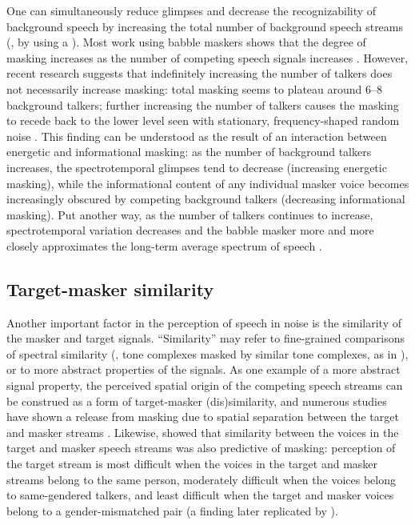 One can simultaneously reduce glimpses and decrease the recognizability of background speech by increasing the total number of background speech streams (\ie, by using a ).  Most work using babble maskers shows that the degree of masking increases as the number of competing speech signals increases \citep[\eg][]{Miller1947, BrungartEtAl2001}.  However, recent research suggests that indefinitely increasing the number of talkers does not necessarily increase masking: total masking seems to plateau around 6–8 background talkers; further increasing the number of talkers causes the masking to recede back to the lower level seen with stationary, frequency-shaped random noise \citep{SimpsonCooke2005}.  This finding can be understood as the result of an interaction between energetic and informational masking: as the number of background talkers increases, the spectrotemporal glimpses tend to decrease (increasing energetic masking), while the informational content of any individual masker voice becomes increasingly obscured by competing background talkers (decreasing informational masking).  Put another way, as the number of talkers continues to increase, spectrotemporal variation decreases and the babble masker more and more closely approximates the long-term average spectrum of speech \citep{SimpsonCooke2005}.

\subsection{Target-masker similarity\label{sec:Similarity}}
Another important factor in the perception of speech in noise is the similarity of the masker and target signals.  “Similarity” may refer to fine-grained comparisons of spectral similarity (\eg, tone complexes masked by similar tone complexes, as in \citealt{LeeRichards2011}), or to more abstract properties of the signals.\footnotemark{}  As one example of a more abstract signal property, the perceived spatial origin of the competing speech streams can be construed as a form of target-masker {(dis)similarity}, and numerous studies have shown a release from masking due to spatial separation between the target and masker streams \citep[\eg][]{FreymanEtAl1999, BrungartSimpson2002, FreymanEtAl2004, GallunEtAl2005, KiddEtAl2005a, JohnstoneLitovsky2006}.  Likewise, \citet{Brungart2001} showed that similarity between the voices in the target and masker speech streams was also predictive of masking: perception of the target stream is most difficult when the voices in the target and masker streams belong to the same person, moderately difficult when the voices belong to same-gendered talkers, and least difficult when the target and masker voices belong to a gender-mismatched pair (a finding later replicated by \citealt{HelferFreyman2008}).


